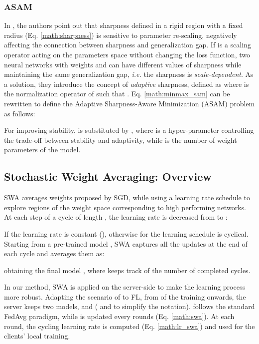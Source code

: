 \subsubsection{ASAM} In \cite{kwon2021asam}, the authors point out that sharpness defined in a rigid region with a fixed radius  (Eq. \ref{math:sharpness}) is sensitive to parameter re-scaling, negatively affecting the connection between sharpness and generalization gap. If  is a scaling operator acting on the parameters space without changing the loss function,
two neural networks with weights  and  can have different values of sharpness while maintaining the same generalization gap, \textit{i.e.} the sharpness is \textit{scale-dependent}. As a solution, they introduce the concept of \textit{adaptive} sharpness, defined as  
where  is the normalization operator of  such that . Eq. \ref{math:minmax_sam} can be rewritten to define the Adaptive Sharpness-Aware Minimization (ASAM) problem as follows:

For improving stability,  is substituted by , where  is a hyper-parameter controlling the trade-off between stability and adaptivity, while  is the number of weight parameters of the model.

\subsection{Stochastic Weight Averaging: Overview}
SWA averages weights proposed by SGD, while using a learning rate schedule to explore regions of the weight space corresponding to high performing networks. At each step  of a cycle of length , the learning rate is decreased from  to :

If  the learning rate is constant (), otherwise for  the learning schedule is cyclical. Starting from a pre-trained model , SWA captures all the updates  at the end of each cycle and averages them as:

obtaining the final model , where  keeps track of the number of completed cycles.

In our method, SWA is applied on the server-side to make the learning process more robust. 
Adapting the scenario of \cite{izmailov2018averaging} to FL, from  of the training onwards, the server keeps two models,  and  ( and  to simplify the notation).  follows the standard FedAvg paradigm, while  is updated every  rounds (Eq. \ref{math:swa}). At each round, the cycling learning rate is computed (Eq. \ref{math:lr_swa}) and used for the clients' local training.

